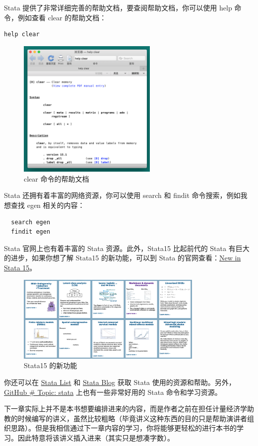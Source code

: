 Stata 提供了非常详细完善的帮助文档，要查阅帮助文档，你可以使用 \textcolor{third3}{help} 命令，例如查看 \textcolor{third3}{clear} 的帮助文档：

\begin{lstlisting}
help clear
\end{lstlisting}

\begin{figure}[htbp]
  \centering
  \includegraphics[width = 0.6\textwidth]{assets/clear.png}
  \caption{clear 命令的帮助文档}
  \label{fig:clear}
\end{figure}

Stata 还拥有着丰富的网络资源，你可以使用 \textcolor{third3}{search} 和 \textcolor{third3}{findit} 命令搜索，例如我想查找 \textcolor{third3}{egen} 相关的内容：

\begin{lstlisting}
  search egen
  findit egen
\end{lstlisting}

Stata 官网上也有着丰富的 Stata 资源。此外，Stata15 比起前代的 Stata 有巨大的进步，如果你想了解 Stata15 的新功能，可以到 Stata 的官网查看：\href{https://www.stata.com/new-in-stata/}{New in Stata 15}。

\begin{figure}[htbp]
  \centering \includegraphics[width= 0.8\textwidth]{assets/newinstata15.png}
  \caption{Stata15 的新功能}
  \label{fig:newinstata15}
\end{figure}

你还可以在 \href{https://www.statalist.org/forums/}{Stata List} 和 \href{https://blog.stata.com/}{Stata Blog} 获取 Stata 使用的资源和帮助。另外， \href{https://github.com/topics/stata}{GitHub \# Topic: stata} 上也有一些非常好用的 Stata 命令和学习资源。

下一章实际上并不是本书想要编排进来的内容，而是作者之前在担任计量经济学助教的时候编写的讲义，虽然比较粗略（毕竟讲义这种东西的目的只是帮助演讲者组织思路）。但是我相信通过下一章内容的学习，你将能够更轻松的进行本书的学习。因此特意将该讲义插入进来（其实只是想凑字数）。
